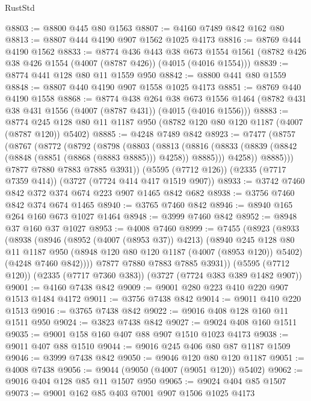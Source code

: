\begin{lexlean}{RustStd}
\begin{coremodule}
@8803 := @8800 @445 @80 @1563
@8807 := @4160 @7489 @842 @162 @80
@8813 := @8807 @444 @4190 @907 @1562 @1025 @4173
@8816 := @8769 @444 @4190 @1562
@8833 := @8774
    @436
    @443
    @38
    @673
    @1554
    @1561
    (@8782 @426 @38 @426 @1554 (@4007 (@8787 @426)) (@4015 (@4016 @1554)))
@8839 := @8774 @441 @128 @80 @11 @1559 @950
@8842 := @8800 @441 @80 @1559
@8848 := @8807 @440 @4190 @907 @1558 @1025 @4173
@8851 := @8769 @440 @4190 @1558
@8868 := @8774
    @438
    @264
    @38
    @673
    @1556
    @1464
    (@8782 @431 @38 @431 @1556 (@4007 (@8787 @431)) (@4015 (@4016 @1556)))
@8883 := @8774 @245 @128 @80 @11 @1187 @950 (@8782 @120 @80 @120 @1187 (@4007 (@8787 @120)) @5402)
@8885 := @4248 @7489 @842
@8923 := @7477
    (@8757
      (@8767
        (@8772
          (@8792
            (@8798
              (@8803
                (@8813
                  (@8816 (@8833 (@8839 (@8842 (@8848 (@8851 (@8868 (@8883 @8885))) @4258)) @8885)))
                  @4258))
              @8885)))
        @7877
        @7880
        @7883
        @7885
        @3931))
    (@5595 (@7712 @126))
    (@2335 (@7717 @7359 @414))
    (@3727 (@7724 @414 @417 @1519 @907))
@8933 := @3742 @7460 @842 @372 @374 @674 @223 @907 @1465 @842 @682
@8938 := @3756 @7460 @842 @374 @674 @1465
@8940 := @3765 @7460 @842
@8946 := @8940 @165 @264 @160 @673 @1027 @1464
@8948 := @3999 @7460 @842
@8952 := @8948 @37 @160 @37 @1027
@8953 := @4008 @7460
@8999 := @7455
    (@8923
      (@8933
        (@8938
          (@8946
            (@8952 (@4007 (@8953 @37)) @4213)
            (@8940
              @245
              @128
              @80
              @11
              @1187
              @950
              (@8948 @120 @80 @120 @1187 (@4007 (@8953 @120)) @5402)
              (@4248 @7460 @842))))
        @7877
        @7880
        @7883
        @7885
        @3931))
    (@5595 (@7712 @120))
    (@2335 (@7717 @7360 @383))
    (@3727 (@7724 @383 @389 @1482 @907))
@9001 := @4160 @7438 @842
@9009 := @9001 @280 @223 @410 @220 @907 @1513 @1484 @4172
@9011 := @3756 @7438 @842
@9014 := @9011 @410 @220 @1513
@9016 := @3765 @7438 @842
@9022 := @9016 @408 @128 @160 @11 @1511 @950
@9024 := @3823 @7438 @842
@9027 := @9024 @408 @160 @1511
@9035 := @9001 @158 @160 @407 @88 @907 @1510 @1023 @4173
@9038 := @9011 @407 @88 @1510
@9044 := @9016 @245 @406 @80 @87 @1187 @1509
@9046 := @3999 @7438 @842
@9050 := @9046 @120 @80 @120 @1187
@9051 := @4008 @7438
@9056 := @9044 (@9050 (@4007 (@9051 @120)) @5402)
@9062 := @9016 @404 @128 @85 @11 @1507 @950
@9065 := @9024 @404 @85 @1507
@9073 := @9001 @162 @85 @403 @7001 @907 @1506 @1025 @4173

\end{coremodule}
\end{lexlean}
